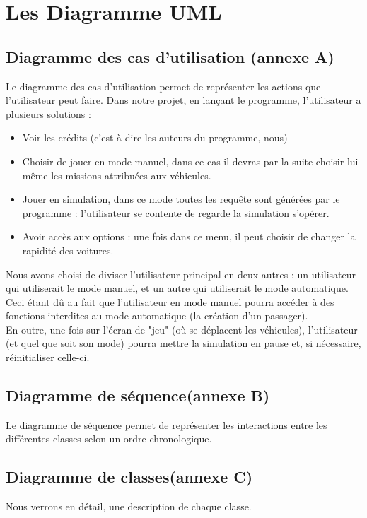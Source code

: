 \documentclass[a4paper, titlepage]{report}
\begin{document}
\chapter{Les Diagramme UML}
\section{Diagramme des cas d'utilisation (annexe A)}
\hspace{0.5cm} Le diagramme des cas d'utilisation permet de représenter les actions que l'utilisateur peut faire. Dans notre projet, en lançant le programme, l'utilisateur a plusieurs solutions :
\begin{itemize}
\item Voir les crédits (c'est à dire les auteurs du programme, nous)
\item Choisir de jouer en mode manuel, dans ce cas il devras par la suite choisir lui-même les missions attribuées aux véhicules.
\item Jouer en simulation, dans ce mode toutes les requête sont générées par le programme : l'utilisateur se contente de regarde la simulation s'opérer.
\item Avoir accès aux options : une fois dans ce menu, il peut choisir de changer la rapidité des voitures.
\end{itemize}
Nous avons choisi de diviser l'utilisateur principal en deux autres : un utilisateur qui utiliserait le mode manuel, et un autre qui utiliserait le mode automatique. Ceci étant dû au fait que l'utilisateur en mode manuel pourra accéder à des fonctions interdites au mode automatique (la création d'un passager).\\
En outre, une fois sur l'écran de "jeu" (où se déplacent les véhicules), l'utilisateur (et quel que soit son mode) pourra mettre la simulation en pause et, si nécessaire, réinitialiser celle-ci. 
\section{Diagramme de séquence(annexe B)}
\hspace{0.5cm} Le diagramme de séquence permet de représenter les interactions entre les différentes classes selon un ordre chronologique.
\section{Diagramme de classes(annexe C)}
\hspace{0.5cm} Nous verrons en détail, une description de chaque classe.
\end{document}
